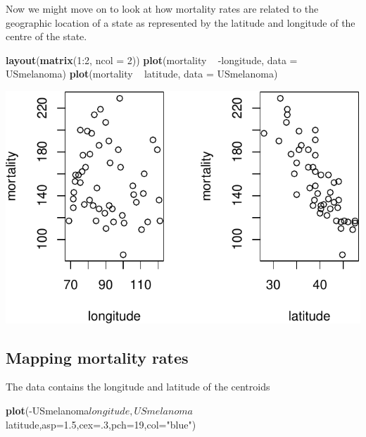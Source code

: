 \documentclass[]{article}
\newenvironment{Shaded}{\begin{snugshade}}{\end{snugshade}}
\newcommand{\KeywordTok}[1]{\textcolor[rgb]{0.13,0.29,0.53}{\textbf{{#1}}}}
\newcommand{\DataTypeTok}[1]{\textcolor[rgb]{0.13,0.29,0.53}{{#1}}}
\newcommand{\DecValTok}[1]{\textcolor[rgb]{0.00,0.00,0.81}{{#1}}}
\newcommand{\FloatTok}[1]{\textcolor[rgb]{0.00,0.00,0.81}{{#1}}}
\newcommand{\StringTok}[1]{\textcolor[rgb]{0.31,0.60,0.02}{{#1}}}
\newcommand{\NormalTok}[1]{{#1}}
\numberwithin{equation}{section}
\begin{document}
Now we might move on to look at how mortality rates are related to the
geographic location of a state as represented by the latitude and
longitude of the centre of the state.

\begin{Shaded}
\begin{Highlighting}[]
\KeywordTok{layout}\NormalTok{(}\KeywordTok{matrix}\NormalTok{(}\DecValTok{1}\NormalTok{:}\DecValTok{2}\NormalTok{, }\DataTypeTok{ncol =} \DecValTok{2}\NormalTok{))}
\KeywordTok{plot}\NormalTok{(mortality ~}\StringTok{ }\NormalTok{-longitude, }\DataTypeTok{data =} \NormalTok{USmelanoma)}
\KeywordTok{plot}\NormalTok{(mortality ~}\StringTok{ }\NormalTok{latitude, }\DataTypeTok{data =} \NormalTok{USmelanoma)}
\end{Highlighting}
\end{Shaded}

\begin{center}\includegraphics{tema1_files/figure-latex/unnamed-chunk-161-1} \end{center}

\subsection{Mapping mortality rates}\label{mapping-mortality-rates}

The data contains the longitude and latitude of the centroids

\begin{Shaded}
\begin{Highlighting}[]
\KeywordTok{plot}\NormalTok{(-USmelanoma$longitude,USmelanoma$latitude,}\DataTypeTok{asp=}\FloatTok{1.5}\NormalTok{,}\DataTypeTok{cex=}\NormalTok{.}\DecValTok{3}\NormalTok{,}\DataTypeTok{pch=}\DecValTok{19}\NormalTok{,}\DataTypeTok{col=}\StringTok{"blue"}\NormalTok{)}
\end{Highlighting}
\end{Shaded}
\end{document}
